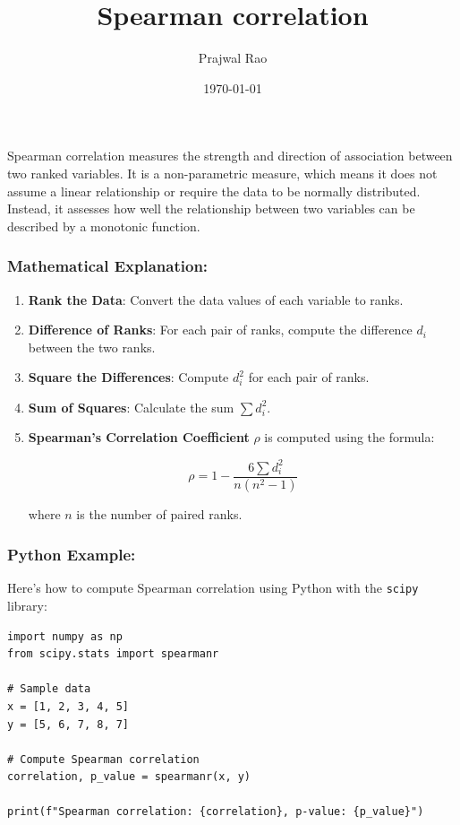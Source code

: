 \documentclass[11pt]{article}
\author{Prajwal Rao}
\date{\today}
\title{Spearman correlation}
\begin{document}
\maketitle
\tableofcontents

Spearman correlation measures the strength and direction of association between two ranked variables. It is a non-parametric measure, which means it does not assume a linear relationship or require the data to be normally distributed. Instead, it assesses how well the relationship between two variables can be described by a monotonic function.
\subsubsection{Mathematical Explanation:}
\label{sec:org4cfec65}

\begin{enumerate}
\item \textbf{Rank the Data}: Convert the data values of each variable to ranks.
\item \textbf{Difference of Ranks}: For each pair of ranks, compute the difference \(d_i\) between the two ranks.
\item \textbf{Square the Differences}: Compute \(d_i^2\) for each pair of ranks.
\item \textbf{Sum of Squares}: Calculate the sum \(\sum d_i^2\).
\item \textbf{Spearman's Correlation Coefficient} \(\rho\) is computed using the formula:

\[
   \rho = 1 - \frac{6 \sum d_i^2}{n(n^2 - 1)}
   \]

where \(n\) is the number of paired ranks.
\end{enumerate}
\subsubsection{Python Example:}
\label{sec:org37ff683}

Here’s how to compute Spearman correlation using Python with the \texttt{scipy} library:

\begin{verbatim}
import numpy as np
from scipy.stats import spearmanr

# Sample data
x = [1, 2, 3, 4, 5]
y = [5, 6, 7, 8, 7]

# Compute Spearman correlation
correlation, p_value = spearmanr(x, y)

print(f"Spearman correlation: {correlation}, p-value: {p_value}")
\end{verbatim}
\end{document}
